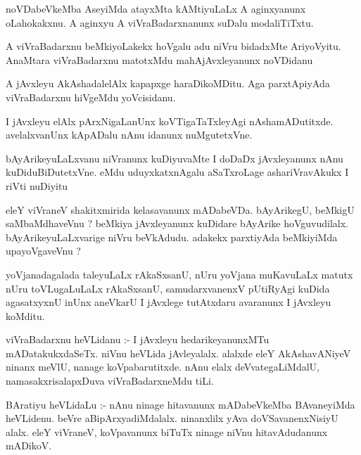 \documentclass{article}
\begin{document}
\begin{mn}
noVDabeVkeMba  AseyiMda  atayxMta  kAMtiyuLaLx  A  aginxyanunx  oLahokakxnu.  A  aginxyu  A  viVraBadarxnanunx  
suDalu  modaliTiTxtu.
\end{mn}

\begin{mn}
A  viVraBadarxnu  beMkiyoLakekx  hoVgalu  adu  niVru  bidadxMte  AriyoVyitu.  AnaMtara  viVraBadarxnu  
matotxMdu  mahAjAvxleyanunx  noVDidanu
\end{mn}

\begin{mn}
A  jAvxleyu  AkAshadalelAlx  kapapxge  haraDikoMDitu.  Aga  parxtApiyAda  viVraBadarxnu  hiVgeMdu  yoVcisidanu.
\end{mn}

\begin{mn}
I  jAvxleyu  elAlx  pArxNigaLanUnx  koVTigaTaTxleyAgi  nAshamADutitxde.  avelalxvanUnx  kApADalu  nAnu  idanunx  nuMgutetxVne.
\end{mn}

\begin{mn}
bAyArikeyuLaLxvanu  niVranunx  kuDiyuvaMte  I  doDaDx  jAvxleyanunx  nAnu  kuDiduBiDutetxVne.  eMdu  uduyxkatxnAgalu  
aSaTxroLage  ashariVravAkukx  I  riVti  nuDiyitu
\end{mn}

\begin{mn}
eleY  viVraneV  shakitxmirida  kelasavanunx  mADabeVDa.  bAyArikegU,  beMkigU  saMbaMdhaveVnu ?  beMkiya  jAvxleyanunx  
kuDidare  bAyArike  hoVguvudilalx.  bAyArikeyuLaLxvarige  niVru  beVkAdudu.  adakekx  parxtiyAda  beMkiyiMda  upayoVgaveVnu ?
\end{mn}

\begin{mn}
yoVjanadagalada  taleyuLaLx  rAkaSxsanU,  nUru  yoVjana  muKavuLaLx  matutx  nUru  toVLugaLuLaLx  rAkaSxsanU,  samudarxvanenxV  
pUtiRyAgi  kuDida  agasatxyxnU  inUnx  aneVkarU  I  jAvxlege  tutAtxdaru  avaranunx  I  jAvxleyu  koMditu.
\end{mn}

\begin{mn}
viVraBadarxnu  heVLidanu :- I  jAvxleyu  hedarikeyanunxMTu  mADatakukxdaSeTx.  niVnu  heVLida  jAvleyalalx.  
alalxde  eleY  AkAshavANiyeV  ninanx  meVlU,  nanage  koVpabarutitxde.  nAnu  elalx  deVvategaLiMdalU,  
namasakxrisalapxDuva  viVraBadarxneMdu  tiLi.
\end{mn}

\begin{mn}
BAratiyu  heVLidaLu :- nAnu  ninage  hitavanunx  mADabeVkeMba  BAvaneyiMda  heVLidenu.  beVre  aBipArxyadiMdalalx.  
ninanxlilx  yAva  doVSavanenxNisiyU  alalx.  eleY  viVraneV,  koVpavanunx  biTuTx   ninage  niVnu  hitavAdudanunx  mADikoV.
\end{mn}
\end{document}
